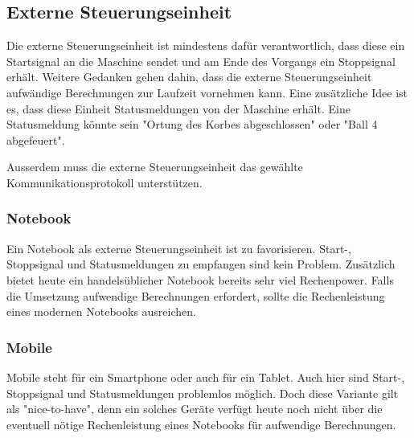 \subsection{Externe Steuerungseinheit}
Die externe Steuerungseinheit ist mindestens dafür verantwortlich, dass diese ein Startsignal an die Maschine sendet und am Ende des Vorgangs ein Stoppsignal erhält. Weitere Gedanken gehen dahin, dass die externe Steuerungseinheit aufwändige Berechnungen zur Laufzeit vornehmen kann. Eine zusätzliche Idee ist es, dass diese Einheit Statusmeldungen von der Maschine erhält. Eine Statusmeldung könnte sein "Ortung des Korbes abgeschlossen" oder "Ball 4 abgefeuert".

Ausserdem muss die externe Steuerungseinheit das gewählte Kommunikationsprotokoll unterstützen.

\subsubsection{Notebook}
Ein Notebook als externe Steuerungseinheit ist zu favorisieren. Start-, Stoppsignal und Statusmeldungen zu empfangen sind kein Problem. Zusätzlich bietet heute ein handelsüblicher Notebook bereits sehr viel Rechenpower. Falls die Umsetzung aufwendige Berechnungen erfordert, sollte die Rechenleistung eines modernen Notebooks ausreichen. 

\subsubsection{Mobile}
Mobile steht für ein Smartphone oder auch für ein Tablet. Auch hier sind Start-, Stoppsignal und Statusmeldungen problemlos möglich. Doch diese Variante gilt als "nice-to-have", denn ein solches Geräte verfügt heute noch nicht über die eventuell nötige Rechenleistung eines Notebooks für aufwendige Berechnungen.
